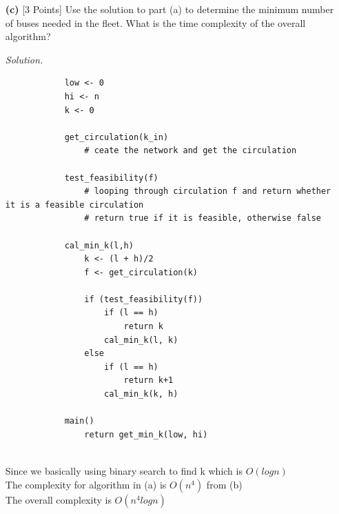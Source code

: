 \documentclass[10pt]{article}
\begin{document}
\begin{enumerate}
\begin{mdframed}
    \end{mdframed}
    \item[\textbf{(c)}] {[3 Points]} Use the solution to part (a) to determine the minimum number of buses needed in the fleet. What is the time complexity of the overall algorithm?
     \begin{mdframed}
        \textit{Solution.}\\
        \begin{lstlisting}
            low <- 0
            hi <- n
            k <- 0
            
            get_circulation(k_in)
                # ceate the network and get the circulation
            
            test_feasibility(f)
                # looping through circulation f and return whether it is a feasible circulation
                # return true if it is feasible, otherwise false
            
            cal_min_k(l,h)
                k <- (l + h)/2
                f <- get_circulation(k)

                if (test_feasibility(f))
                    if (l == h)
                        return k
                    cal_min_k(l, k)
                else 
                    if (l == h)
                        return k+1
                    cal_min_k(k, h)

            main()
                return get_min_k(low, hi)
        \end{lstlisting}
        \\Since we basically using binary search to find k which is $O(logn)$
        \\The complexity for algorithm in (a) is $O(n^4)$ from (b)
        \\The overall complexity is $O(n^4logn)$
    \end{mdframed}
\end{enumerate}
\end{document}
